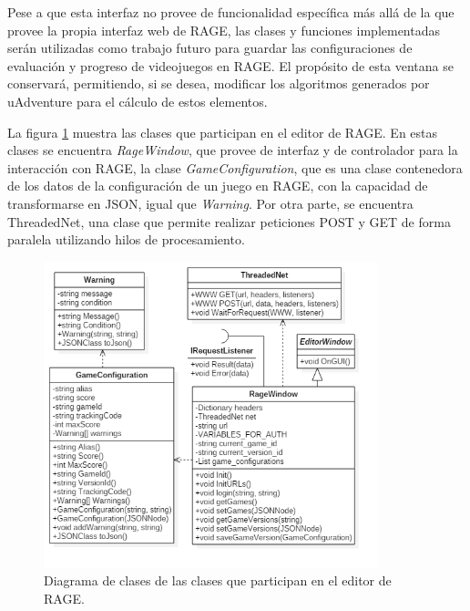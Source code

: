 Pese a que esta interfaz no provee de funcionalidad específica más allá de la que provee la propia interfaz web de RAGE, las clases y funciones implementadas serán utilizadas como trabajo futuro para guardar las configuraciones de evaluación y progreso de videojuegos en RAGE. El propósito de esta ventana se conservará, permitiendo, si se desea, modificar los algoritmos generados por uAdventure para el cálculo de estos elementos.

La figura \ref{ragewindowit3} muestra las clases que participan en el editor de RAGE. En estas clases se encuentra \textit{RageWindow}, que provee de interfaz y de controlador para la interacción con RAGE, la clase \textit{GameConfiguration}, que es una clase contenedora de los datos de la configuración de un juego en RAGE, con la capacidad de transformarse en JSON, igual que \textit{Warning}. Por otra parte, se encuentra ThreadedNet, una clase que permite realizar peticiones POST y GET de forma paralela utilizando hilos de procesamiento.

\begin{figure}[h!]
	\centerline{\includegraphics[height=3.5in]{figures/it3/RageWindow.png}}
	\caption[Diagrama de Clases - Editor de RAGE]{Diagrama de clases de las clases que participan en el editor de RAGE.}
	\label{ragewindowit3}
\end{figure}
